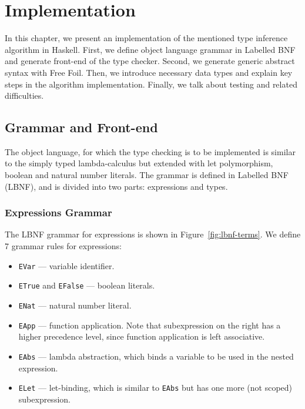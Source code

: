\chapter{Implementation}
\label{chap:implementation}

In this chapter, we present an implementation of the mentioned type inference algorithm in Haskell. First, we define object language grammar in Labelled BNF and generate front-end of the type checker. Second, we generate generic abstract syntax with Free Foil. Then, we introduce necessary data types and explain key steps in the algorithm implementation. Finally, we talk about testing and related difficulties.

\section{Grammar and Front-end}

The object language, for which the type checking is to be implemented is similar to the simply typed lambda-calculus but extended with let polymorphism, boolean and natural number literals. The grammar is defined in Labelled BNF (LBNF), and is divided into two parts: expressions and types.


\subsection{Expressions Grammar}

The LBNF grammar for expressions is shown in Figure~\ref{fig:lbnf-terms}. We define 7 grammar rules for expressions:

\begin{itemize}
  \item \texttt{EVar} — variable identifier.
  \item \texttt{ETrue} and \texttt{EFalse} — boolean literals.
  \item \texttt{ENat} — natural number literal.
  \item \texttt{EApp} — function application. Note that subexpression on the right has a higher precedence level, since function application is left associative.
  \item \texttt{EAbs} — lambda abstraction, which binds a variable to be used in the nested expression.
  \item \texttt{ELet} — let-binding, which is similar to \texttt{EAbs} but has one more (not scoped) subexpression.
\end{itemize}

